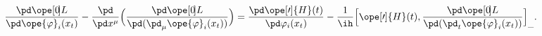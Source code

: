 \begin{equation*}
\frac{\pd\ope[0\mspace{-3mu}]{L}}{\pd \ope{\varphi}_i(x_t)}
-
\frac{\pd}{\pd x^\mu}\Bigl(
	\frac{\pd\ope[0\mspace{-3mu}]{L}}{\pd(\pd_\mu\ope{\varphi}_i(x_t) )}
	 \Bigr)
=
\frac{\pd \ope[\prime]{H}(t)}{\pd\varphi_i(x_t)}
- \frac{1}{\ih}
\Bigl[
	\ope[\prime]{H}(t) ,
	\frac{\pd\ope[0\mspace{-3mu}]{L}}{\pd(\pd_t\ope{\varphi}_i(x_t) )}
\Bigr]_{\_} .
	\end{equation*}


